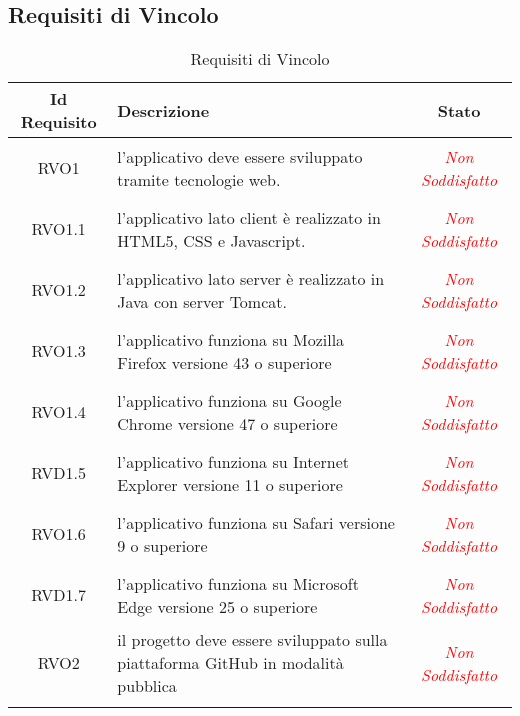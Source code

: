 \subsection{Requisiti di Vincolo}
\normalsize
\begin{longtable}{|c|>{\centering}m{7cm}|c|}
\hline 
\textbf{Id Requisito} & \textbf{Descrizione} & \textbf{Stato}\\
\hline
\endhead
\hypertarget{RVO1}{RVO1} & l'applicativo deve essere sviluppato tramite tecnologie web. & \textcolor{red}{\textit{Non Soddisfatto}}\\ \hline

\hypertarget{RVO1.1}{RVO1.1} & l'applicativo lato client è realizzato in HTML5, CSS e Javascript. & \textcolor{red}{\textit{Non Soddisfatto}}\\ \hline

\hypertarget{RVO1.2}{RVO1.2} & l'applicativo lato server è realizzato in Java con server Tomcat. & \textcolor{red}{\textit{Non Soddisfatto}}\\ \hline

\hypertarget{RVO1.3}{RVO1.3} & l'applicativo funziona su Mozilla Firefox versione 43 o superiore & \textcolor{red}{\textit{Non Soddisfatto}}\\ \hline

\hypertarget{RVO1.4}{RVO1.4} & l'applicativo funziona su Google Chrome versione 47 o superiore	 & \textcolor{red}{\textit{Non Soddisfatto}}\\ \hline

\hypertarget{RVD1.5}{RVD1.5} & l'applicativo funziona su Internet Explorer versione 11 o superiore	 & \textcolor{red}{\textit{Non Soddisfatto}}\\ \hline

\hypertarget{RVO1.6}{RVO1.6} & l'applicativo funziona su Safari versione 9 o superiore & \textcolor{red}{\textit{Non Soddisfatto}}\\ \hline

\hypertarget{RVD1.7}{RVD1.7} & l'applicativo funziona su Microsoft Edge versione 25 o superiore & \textcolor{red}{\textit{Non Soddisfatto}}\\ \hline

\hypertarget{RVO2}{RVO2} & il progetto deve essere sviluppato sulla piattaforma GitHub in modalità pubblica & \textcolor{red}{\textit{Non Soddisfatto}}\\ \hline

\caption[Requisiti di Vincolo]{Requisiti di Vincolo}
\label{tabella:req3}
\end{longtable}
\clearpage

